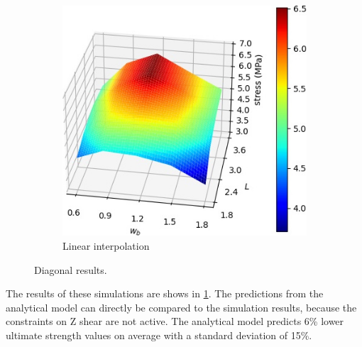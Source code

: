 \begin{figure}
	\centering
	\begin{subfigure}[B]{.49\columnwidth}
		\centering
		\includegraphics[width=\columnwidth]{sources/simulation/diagonal_sim_response.jpg}
		\caption{Linear interpolation}
	\end{subfigure}
	\caption{Diagonal results.}
	\label{fig:sim_diagonal_model}
\end{figure}


The results of these simulations are shows in \cref{fig:sim_diagonal_model}.
The predictions from the analytical model can directly be compared to the simulation results, because the constraints on Z shear are not active.
The analytical model predicts 6\% lower ultimate strength values on average with a standard deviation of 15\%.










